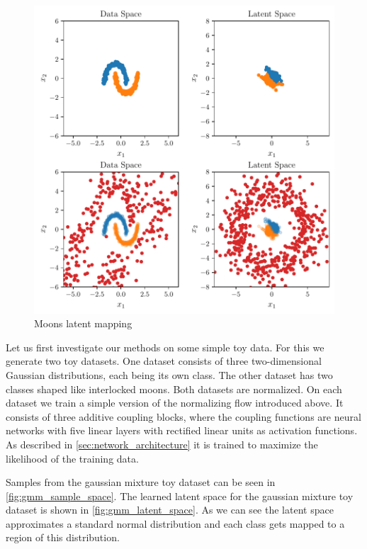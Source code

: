 \begin{figure}[htpb]
	\centering
        \includegraphics{figures/toy_example/moons/latent_mapping.pdf}
	\caption{Moons latent mapping}%
	\label{fig:latent_moons}
\end{figure}

Let us first investigate our methods on some simple toy data. For this we
generate two toy datasets. One dataset consists of three two-dimensional
Gaussian distributions, each being its own class. The other dataset has two
classes shaped like interlocked moons. Both datasets are normalized. On each
dataset we train a simple version of the normalizing flow introduced above. It
consists of three additive coupling blocks, where the coupling
functions are neural networks with five linear layers with rectified linear
units as activation functions. As described in
\autoref{sec:network_architecture} it is trained to maximize the likelihood of
the training data.

Samples from the gaussian mixture toy dataset can be seen in
\autoref{fig:gmm_sample_space}. The learned latent space for the gaussian
mixture toy dataset is shown in \autoref{fig:gmm_latent_space}. As we can see
the latent space approximates a standard normal distribution and each class
gets mapped to a region of this distribution.

